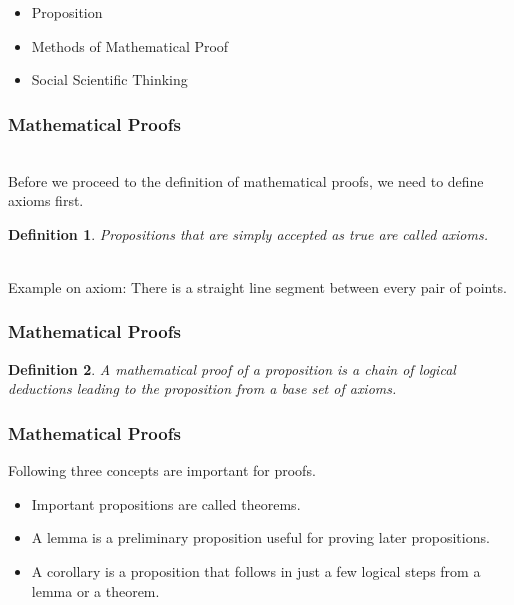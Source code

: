 \documentclass{beamer}
\newtheorem{defn}{Definition}
\numberwithin{equation}{section}
\begin{document}
\begin{frame}

\begin{itemize}
\item \textcolor{mygray}{Proposition}
\item \textcolor{myblack}{Methods of Mathematical Proof}
\item \textcolor{mygray}{Social Scientific Thinking}
\end{itemize}

\end{frame}



\begin{frame}
\frametitle{Mathematical Proofs}

\ \\Before we proceed to the definition of mathematical proofs, we need to define axioms first. \pause

\begin{defn}
Propositions that are simply accepted as true are called axioms.
\end{defn} \pause

\ \\Example on axiom: There is a straight line segment between every pair of points.

\end{frame}



\begin{frame}
\frametitle{Mathematical Proofs}

\begin{defn}
A mathematical proof of a proposition is a chain of logical deductions leading to the proposition from a base set of axioms.
\end{defn}

\end{frame}



\begin{frame}
\frametitle{Mathematical Proofs}

Following three concepts are important for proofs. \pause

\begin{itemize}
\item Important propositions are called theorems. \pause
\item A lemma is a preliminary proposition useful for proving later propositions. \pause
\item A corollary is a proposition that follows in just a few logical steps from a lemma or a theorem.
\end{itemize}

\end{frame}
\end{document}
